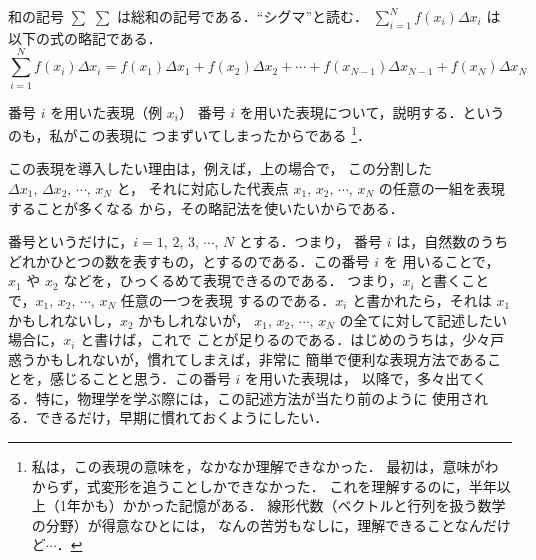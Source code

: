                 \begin{memo}{和の記号 $\sum$}
                    $\sum$ は総和の記号である．“シグマ”と読む．
                    $\displaystyle\sum_{i=1}^{N} f(x_{i})\Delta x_{i}$ は
                    以下の式の略記である．
                    \begin{equation*}
                        \sum_{i=1}^{N} f(x_{i})\Delta x_{i}= f(x_{1})\Delta x_{1}+ f(x_{2})\Delta x_{2}+
                        \cdots +  f(x_{N-1})\Delta x_{N-1}+ f(x_{N})\Delta x_{N}
                    \end{equation*}
                \end{memo}

                \begin{memo}{番号 $i$ を用いた表現（例 $x_{i}$）}
                    番号 $i$ を用いた表現について，説明する．というのも，私がこの表現に
                    つまずいてしまったからである
                        \footnote{
                            私は，この表現の意味を，なかなか理解できなかった．
                            最初は，意味がわからず，式変形を追うことしかできなかった．
                            これを理解するのに，半年以上（1年かも）かかった記憶がある．
                            線形代数（ベクトルと行列を扱う数学の分野）が得意なひとには，
                            なんの苦労もなしに，理解できることなんだけど$\cdots$．
                        }．

                    この表現を導入したい理由は，例えば，上の場合で，
                    この分割した $\Delta x_{1},\,\Delta x_{2},\,\cdots,\,x_{N}$ と，
                    それに対応した代表点 $x_{1},\,x_{2},\,\cdots,\,x_{N}$ の任意の一組を表現することが多くなる
                    から，その略記法を使いたいからである．

                    番号というだけに，$i=1,\,2,\,3,\,\cdots,\,N$ とする．つまり，
                    番号 $i$ は，自然数のうちどれかひとつの数を表すもの，とするのである．この番号 $i$ を
                    用いることで，$x_{1}$ や $x_{2}$ などを，ひっくるめて表現できるのである．
                    つまり，$x_{i}$ と書くことで，$x_{1},\,x_{2},\,\cdots,\,x_{N}$ 任意の一つを表現
                    するのである．$x_{i}$ と書かれたら，それは $x_{1}$ かもしれないし，$x_{2}$ かもしれないが，
                    $x_{1},\,x_{2},\,\cdots,\,x_{N}$ の全てに対して記述したい場合に，$x_{i}$ と書けば，これで
                    ことが足りるのである．はじめのうちは，少々戸惑うかもしれないが，慣れてしまえば，非常に
                    簡単で便利な表現方法であることを，感じることと思う．この番号 $i$ を用いた表現は，
                    以降で，多々出てくる．特に，物理学を学ぶ際には，この記述方法が当たり前のように
                    使用される．できるだけ，早期に慣れておくようにしたい．
                \end{memo}


